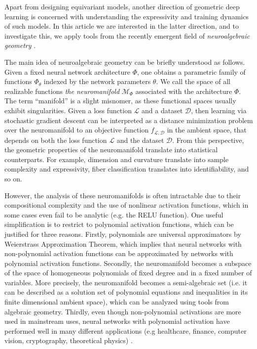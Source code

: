 \documentclass[final]{article}
\theoremstyle{definition}
\theoremstyle{plain}
\begin{document}
Apart from designing equivariant models, another direction of geometric deep learning is concerned with understanding the expressivity and training dynamics of such models.
In this article we are interested in the latter direction, and to investigate this, we apply tools from the recently emergent field of \emph{neuroalgebraic geometry} \cite{marchetti2025algebraunveilsdeeplearning}.

The main idea of neuroalgebraic geometry can be briefly understood as follows. 
Given a fixed neural network architecture $\Phi$, one obtains a parametric family of functions $\Phi_\theta$ indexed by the network parameters $\theta$.
We call the space of all realizable functions \emph{the neuromanifold} $\mathcal{M}_\Phi$ associated with the architecture $\Phi$. 
The term “manifold” is a slight misnomer, as these functional spaces usually exhibit singularities.
Given a loss function $\mathcal{L}$ and a dataset $\mathcal{D}$, then learning via stochastic gradient descent can be interpreted as a distance minimization problem over the neuromanifold to an objective function $f_{\mathcal{L}, \mathcal{D}}$ in the ambient space, that depends on both the loss function $\mathcal{L}$ and the dataset $\mathcal{D}$.
From this perspective, the geometric properties of the neuromanifold translate into statistical counterparts. 
For example, dimension and curvature translate into sample complexity and expressivity, fiber classification translates into identifiability, and so on.

However, the analysis of these neuromanifolds is often intractable due to their compositional complexity and the use of nonlinear activation functions, which in some cases even fail to be analytic (e.g. the RELU function). 
One useful simplification is to restrict to polynomial activation functions, which can be justified for three reasons. Firstly, polynomials are universal approximators by Weierstrass Approximation Theorem, which implies that neural networks with non-polynomial activation functions can be approximated by networks with polynomial activation functions.
Secondly, the neuromanifold becomes a subspace of the space of homogeneous polynomials of fixed degree and in a fixed number of variables. 
More precisely, the neuromanifold becomes a semi-algebraic set (i.e. it can be described as a solution set of polynomial equations and inequalities in its finite dimensional ambient space), which can be analyzed using tools from algebraic geometry. 
Thirdly, even though non-polynomial activations are more used in mainstream uses, neural networks with polynomial activation have performed well in many different applications (e.g healthcare, finance, computer vision, cryptography, theoretical physics) \cite{DEY2016130, Fong2022, GHAZALI20113765, Nayak2018, 9665897, poly2021, DBLP:journals/corr/abs-1711-05189, pmlr-v145-douglas22a}. 
\end{document}
